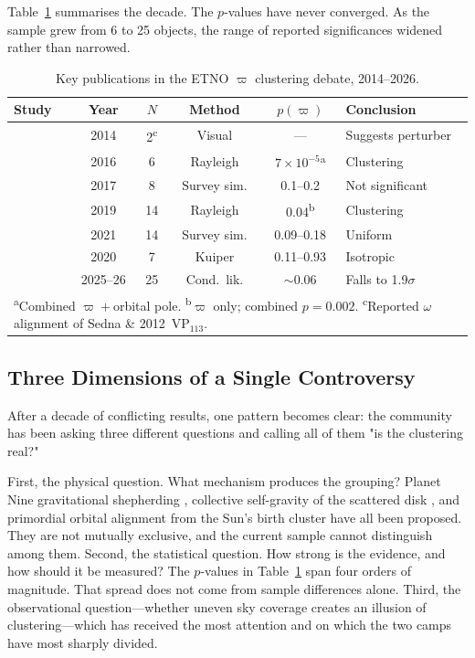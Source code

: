 \documentclass{aa}
\begin{document}
Table~\ref{tab:timeline} summarises the decade. The $p$-values have never converged. As the sample grew from 6 to 25 objects, the range of reported significances widened rather than narrowed.

\begin{table}[htbp]
\centering
\caption{Key publications in the ETNO $\varpi$ clustering debate, 2014--2026.}
\label{tab:timeline}
\footnotesize
\begin{tabular}{p{2.8cm}ccccp{2.8cm}}
\hline
Study & Year & $N$ & Method & $p(\varpi)$ & Conclusion \\
\hline
\citet{trujillo2014} & 2014 & 2\textsuperscript{c} & Visual & --- & Suggests perturber \\
\citet{batygin2016} & 2016 & 6 & Rayleigh & $7{\times}10^{-5}$\textsuperscript{a} & Clustering \\
\citet{shankman2017} & 2017 & 8 & Survey sim. & 0.1--0.2 & Not significant \\
\citet{brown2019} & 2019 & 14 & Rayleigh & 0.04\textsuperscript{b} & Clustering \\
\citet{napier2021} & 2021 & 14 & Survey sim. & 0.09--0.18 & Uniform \\
\citet{bernardinelli2020} & 2020 & 7 & Kuiper & 0.11--0.93 & Isotropic \\
\citet{siraj2025,siraj2026} & 2025--26 & 25 & Cond.\ lik. & $\sim$0.06 & Falls to 1.9$\sigma$ \\
\hline
\multicolumn{6}{l}{\footnotesize\textsuperscript{a}Combined $\varpi{+}$orbital pole. \textsuperscript{b}$\varpi$ only; combined $p{=}0.002$. \textsuperscript{c}Reported $\omega$ alignment of Sedna \& 2012~VP$_{113}$.} \\
\end{tabular}
\end{table}

\subsection{Three Dimensions of a Single Controversy}

After a decade of conflicting results, one pattern becomes clear: the community has been asking three different questions and calling all of them "is the clustering real?"

First, the physical question. What mechanism produces the grouping? Planet Nine gravitational shepherding \citep{batygin2016,brown2019}, collective self-gravity of the scattered disk \citep{madigan2018,zderic2020}, and primordial orbital alignment from the Sun's birth cluster \citep{trujillo2014} have all been proposed. They are not mutually exclusive, and the current sample cannot distinguish among them. Second, the statistical question. How strong is the evidence, and how should it be measured? The $p$-values in Table~\ref{tab:timeline} span four orders of magnitude. That spread does not come from sample differences alone. Third, the observational question---whether uneven sky coverage creates an illusion of clustering---which has received the most attention and on which the two camps have most sharply divided.
\end{document}
